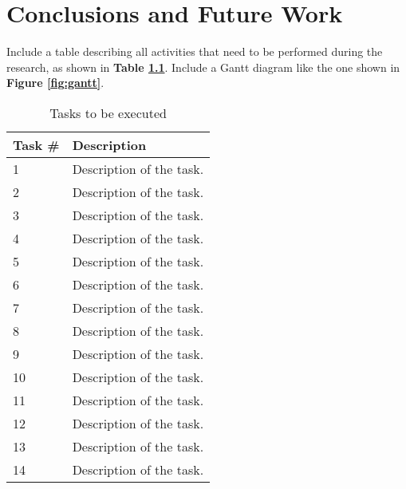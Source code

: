 \chapter{Conclusions and Future Work}

\label{chapter:schedule}

Include a table describing all activities that need to be performed during the research, as shown in \textbf{Table \ref{tab:tasks}}. Include a Gantt diagram like the one shown in \textbf{Figure \ref{fig:gantt}}.

\begin{table}
	\centering
	\renewcommand{\arraystretch}{1}
	\caption{Tasks to be executed}
	\label{tab:tasks}
	\begin{tabular}{|p{1.75cm} |p{13cm}|}
		\hline
		\bfseries  Task \# &\bfseries Description \\
		\hline
		\multirow{1}{*}{1} &
		Description of the task.  \\
		\hline
		\multirow{1}{*}{2} &
		Description of the task. \\
		\hline
		\multirow{1}{*}{3} &
		Description of the task. \\
		\hline
		\multirow{1}{*}{4} & Description of the task. \\
		\hline
		\multirow{1}{*}{5} & Description of the task.\\
		\hline
		\multirow{1}{*}{6} & Description of the task. \\
		\hline
		\multirow{1}{*}{7} & Description of the task. \\
		\hline 
		\multirow{1}{*}{8} & Description of the task. \\
		\hline
		\multirow{1}{*}{9} & Description of the task. \\
		\hline
		\multirow{1}{*}{10} & Description of the task. \\
		\hline
		\multirow{1}{*}{11} & Description of the task. \\
		\hline
		\multirow{1}{*}{12} & Description of the task.\\
		\hline
		\multirow{1}{*}{13} & Description of the task. \\
		\hline
		\multirow{1}{*}{14} & Description of the task. \\
		\hline
	\end{tabular}
\end{table}



